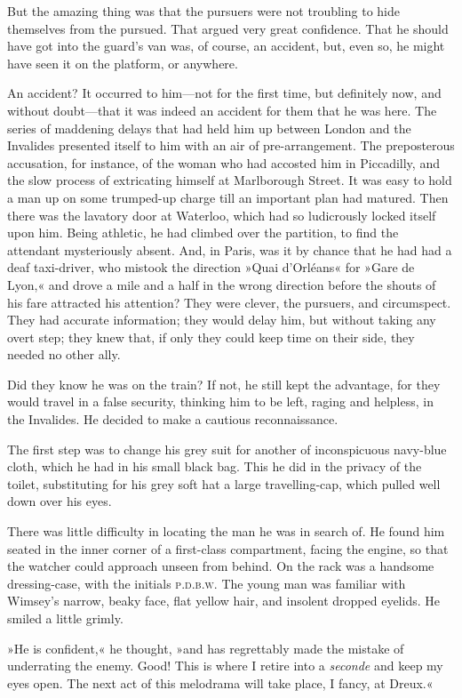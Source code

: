 But the amazing thing was that the pursuers were not troubling to hide themselves from the pursued. That argued very great confidence. That he should have got into the guard's van was, of course, an accident, but, even so, he might have seen it on the platform, or anywhere.

An accident? It occurred to him—not for the first time, but definitely now, and without doubt—that it was indeed an accident for them that he was here. The series of maddening delays that had held him up between London and the Invalides presented itself to him with an air of pre-arrangement. The preposterous accusation, for instance, of the woman who had accosted him in Piccadilly, and the slow process of extricating himself at Marlborough Street. It was easy to hold a man up on some trumped-up charge till an important plan had matured. Then there was the lavatory door at Waterloo, which had so ludicrously locked itself upon him. Being athletic, he had climbed over the partition, to find the attendant mysteriously absent. And, in Paris, was it by chance that he had had a deaf taxi-driver, who mistook the direction »Quai d'Orléans« for »Gare de Lyon,« and drove a mile and a half in the wrong direction before the shouts of his fare attracted his attention? They were clever, the pursuers, and circumspect. They had accurate information; they would delay him, but without taking any overt step; they knew that, if only they could keep time on their side, they needed no other ally.

Did they know he was on the train? If not, he still kept the advantage, for they would travel in a false security, thinking him to be left, raging and helpless, in the Invalides. He decided to make a cautious reconnaissance.

The first step was to change his grey suit for another of inconspicuous navy-blue cloth, which he had in his small black bag. This he did in the privacy of the toilet, substituting for his grey soft hat a large travelling-cap, which pulled well down over his eyes.

There was little difficulty in locating the man he was in search of. He found him seated in the inner corner of a first-class compartment, facing the engine, so that the watcher could approach unseen from behind. On the rack was a handsome dressing-case, with the initials \textsc{p.d.b.w.} The young man was familiar with Wimsey's narrow, beaky face, flat yellow hair, and insolent dropped eyelids. He smiled a little grimly.

»He is confident,« he thought, »and has regrettably made the mistake of underrating the enemy. Good! This is where I retire into a \textit{seconde} and keep my eyes open. The next act of this melodrama will take place, I fancy, at Dreux.«

